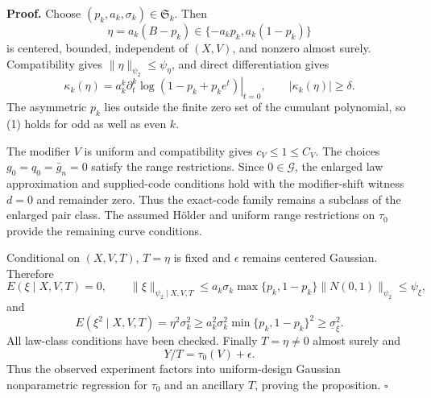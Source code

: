 \textbf{Proof.}
Choose \((p_k,a_k,\sigma_k)\in\mathfrak S_k\).  Then
\[
 \eta=a_k(B-p_k)\in\{-a_kp_k,a_k(1-p_k)\}
\]
is centered, bounded, independent of \((X,V)\), and nonzero almost surely.
Compatibility gives \(\|\eta\|_{\psi_2}\le\psi_\eta\), and direct differentiation gives
\[
 \kappa_k(\eta)=a_k^k
 \left.\partial_t^k\log(1-p_k+p_ke^t)\right|_{t=0},
 \qquad |\kappa_k(\eta)|\ge\delta. \tag{1}
\]
The asymmetric \(p_k\) lies outside the finite zero set of the cumulant polynomial, so (1) holds for odd as well as even \(k\).

The modifier \(V\) is uniform and compatibility gives
\(c_V\le1\le C_V\).  The choices
\(g_0=q_0=\bar g_n=0\) satisfy the range restrictions.  Since
\(0\in\mathcal G\), the enlarged law approximation and supplied-code conditions hold with the modifier-shift witness \(d=0\) and remainder zero.  Thus the exact-code family remains a subclass of the enlarged pair class.  The assumed Hölder and uniform range restrictions on \(\tau_0\) provide the remaining curve conditions.

Conditional on \((X,V,T)\), \(T=\eta\) is fixed and \(\epsilon\) remains centered Gaussian.  Therefore
\[
 E(\xi\mid X,V,T)=0,\qquad
 \|\xi\|_{\psi_2\mid X,V,T}
 \le a_k\sigma_k\max\{p_k,1-p_k\}\|N(0,1)\|_{\psi_2}
 \le\psi_\xi, \tag{2}
\]
and
\[
 E(\xi^2\mid X,V,T)
 =\eta^2\sigma_k^2
 \ge a_k^2\sigma_k^2\min\{p_k,1-p_k\}^2
 \ge\underline\sigma_\xi^2. \tag{3}
\]
All law-class conditions have been checked.  Finally \(T=\eta\ne0\) almost surely and
\[
 Y/T=\tau_0(V)+\epsilon. \tag{4}
\]
Thus the observed experiment factors into uniform-design Gaussian nonparametric regression for \(\tau_0\) and an ancillary \(T\), proving the proposition. \(\square\)